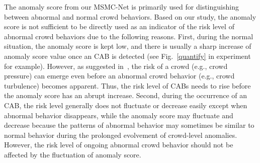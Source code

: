 \documentclass[journal]{IEEEtran}
\begin{document}
The anomaly score from our MSMC-Net is primarily used for distinguishing between abnormal and normal crowd behaviors. Based on our study, the anomaly score is not sufficient to be directly used as an indicator of the risk level of abnormal crowd behaviors due to the following reasons. First, during the normal situation, the anomaly score is kept low, and there is usually a sharp increase of anomaly score value once an CAB is detected (see Fig.~\ref{quantify} in experiment for example). However, as suggested in~\cite{helbing2012crowd}, the risk of a crowd (e.g., crowd pressure) can emerge even before an abnormal crowd behavior (e.g., crowd turbulence) becomes apparent. Thus, the risk level of CABs needs to rise before the anomaly score has an abrupt increase. Second, during the occurrence of an CAB, the risk level generally does not fluctuate or decrease easily except when abnormal behavior disappears, while the anomaly score may fluctuate and decrease because the patterns of abnormal behavior may sometimes be similar to normal behavior during the prolonged evolvement of crowd-level anomalies. However, the risk level of ongoing abnormal crowd behavior should not be affected by the fluctuation of anomaly score.
\end{document}
